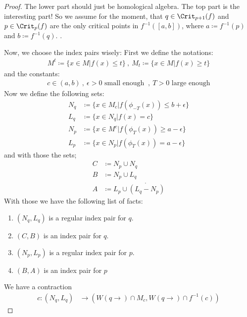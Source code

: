 \begin{proof}
    The lower part should just be homological algebra. \todo{}
    The top part is the interesting part! So we assume for the moment, that $q\in \Crit_{p+1}(f)$ and $p\in \Crit_p(f)$ are the only critical points in $f^{-1}([a,b])$, where $a\coloneq f^{-1}(p)$ and $b\coloneq f^{-1}(q)$. .

    Now, we choose the index pairs wisely:
    First we define the notations:
    \begin{align*}
        M^t\coloneq \{x\in M| f(x)\leq t\}~,~ M_t\coloneq \{x\in M| f(x)\geq t\}
    \end{align*}
    and the constants:
    \begin{align*}
        c\in (a,b)~,~ \epsilon>0 \text{ small enough }~,~ T>0 \text{ large enough}
    \end{align*}
    Now we define the following sets:
    \begin{align*}
        N_q  & \coloneq    \{ x\in M_c |f(\phi_{-T}(x))  \leq b+ \epsilon  \}    \\
        L_q  & \coloneq    \{ x\in N_q |f(x)             =    c            \}    \\
        N_p  & \coloneq    \{ x\in M^c |f(\phi_T(x))     \geq a-\epsilon   \}    \\
        L_p  & \coloneq    \{ x\in N_p |f( \phi_T(x))    =    a-\epsilon   \}
    \end{align*}
    and with those the sets;
    \begin{align*}
        C  & \coloneq  N_p \cup N_q                      \\
        B  & \coloneq  N_p \cup L_q                      \\
        A  & \coloneq  L_p \cup \mathring{(L_q-N_p)}
    \end{align*}
    With those we have the following list of facts:
    \begin{enumerate}
        \item $(N_q,L_q)$ is a regular index pair for $q$.
        \item $(C,B)$ is an index pair for $q$.
        \item $(N_p,L_p)$ is a regular index pair for $p$.
        \item $(B,A)$ is an index pair for $p$
    \end{enumerate}
    We have a contraction
    \begin{align*}
      c:        (N_q,L_q )      &\to        (W(q\to)\cap M_c,W(q\to )\cap f^{-1}(c))

\end{align*}
\end{proof}
